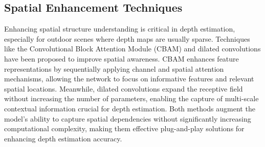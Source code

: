 \subsection{Spatial Enhancement Techniques}
Enhancing spatial structure understanding is critical in depth estimation, especially for outdoor scenes where depth maps are usually sparse. Techniques like the Convolutional Block Attention Module (CBAM) \cite{c28} and dilated convolutions \cite{c29} have been proposed to improve spatial awareness. CBAM enhances feature representations by sequentially applying channel and spatial attention mechanisms, allowing the network to focus on informative features and relevant spatial locations. Meanwhile, dilated convolutions expand the receptive field without increasing the number of parameters, enabling the capture of multi-scale contextual information crucial for depth estimation. Both methods augment the model's ability to capture spatial dependencies without significantly increasing computational complexity, making them effective plug-and-play solutions for enhancing depth estimation accuracy.